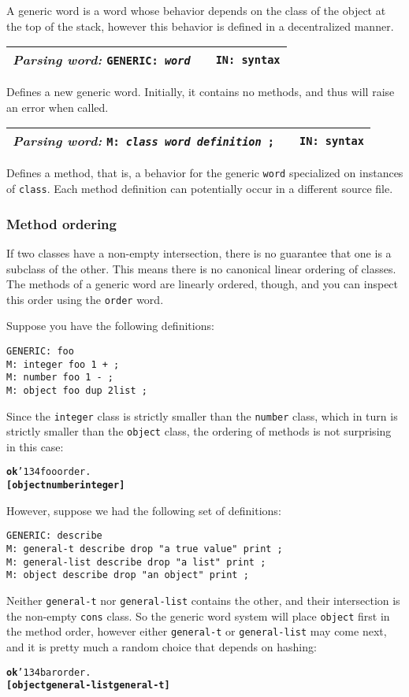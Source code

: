 \documentclass{report}
\newcommand{\bs}{\char'134}
\newcommand{\parsingword}[3]{\index{#1}
\emph{Parsing word:} \texttt{#2} &&\texttt{IN: #3}}
\newcommand{\wordtable}[1]{

\begin{tabularx}{12cm}[t]{lXr}
\hline
#1\\
\hline
\end{tabularx}

}
\begin{document}
A generic word is a word whose behavior depends on the class of the
object at the top of the stack, however this behavior is defined in a
decentralized manner.

\wordtable{
\parsingword{GENERIC:}{GENERIC: \emph{word}}{syntax}
}
Defines a new generic word. Initially, it contains no methods, and thus will raise an error when called.

\wordtable{
\parsingword{M:}{M: \emph{class} \emph{word} \emph{definition} ;}{syntax}
}
Defines a method, that is, a behavior for the generic \texttt{word} specialized on instances of \texttt{class}. Each method definition
can potentially occur in a different source file.

\subsubsection{\label{method-order}Method ordering}

If two classes have a non-empty intersection, there is no guarantee that one is a subclass of the other. This means there is no canonical linear ordering of classes. The methods of a generic word are linearly ordered, though, and you can inspect this order using the \texttt{order} word.

Suppose you have the following definitions:
\begin{verbatim}
GENERIC: foo
M: integer foo 1 + ;
M: number foo 1 - ;
M: object foo dup 2list ;
\end{verbatim}
Since the \texttt{integer} class is strictly smaller than the \texttt{number} class, which in turn is strictly smaller than the \texttt{object} class, the ordering of methods is not surprising in this case:
\begin{alltt}
\textbf{ok} \bs foo order .
\textbf{[ object number integer ]}
\end{alltt}
However, suppose we had the following set of definitions:
\begin{verbatim}
GENERIC: describe
M: general-t describe drop "a true value" print ;
M: general-list describe drop "a list" print ;
M: object describe drop "an object" print ;
\end{verbatim}
Neither \texttt{general-t} nor \texttt{general-list} contains the other, and their intersection is the non-empty \texttt{cons} class. So the generic word system will place \texttt{object} first in the method order, however either \texttt{general-t} or \texttt{general-list} may come next, and it is pretty much a random choice that depends on hashing:
\begin{alltt}
\textbf{ok} \bs bar order .
\textbf{[ object general-list general-t ]}
\end{alltt}
\end{document}
